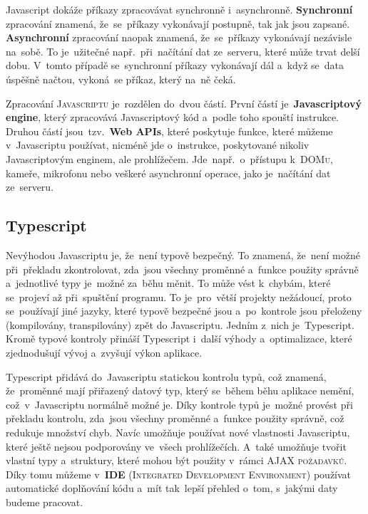 \documentclass[14pt,a4paper]{article}
\begin{document}
        Javascript dokáže příkazy zpracovávat synchronně i~asynchronně. \textbf{Synchronní} zpracování znamená, že~se~příkazy vykonávají postupně, tak jak
        jsou zapsané. \textbf{Asynchronní} zpracování naopak znamená, že~se~příkazy vykonávají nezávisle na~sobě. To je~užitečné např.~při~načítání dat ze~serveru,
        které může trvat delší dobu. V~tomto případě se~synchronní příkazy vykonávají dál a~když se~data úspěšně načtou, vykoná~se příkaz, který na~ně čeká. \parencite{kantor_javascript}

        Zpracování \textsc{Javascriptu} je~rozdělen do~dvou částí. První částí je~\textbf{Javascriptový engine}, který zpracovává Javascriptový kód a~podle toho spouští instrukce. Druhou částí jsou~tzv.~\textbf{Web APIs}, které poskytuje funkce, které můžeme v~Javascriptu používat, nicméně jde o~instrukce, poskytované nikoliv Javascriptovým enginem, ale prohlížečem. Jde~např.~o~přístupu k~\textsc{DOMu}, kameře, mikrofonu nebo veškeré asynchronní operace, jako je~načítání dat ze~serveru. \parencite{mdn:js}

        \subsection{Typescript}
        Nevýhodou Javascriptu je, že~není typově bezpečný. To znamená, že~není možné při~překladu zkontrolovat, zda~jsou všechny proměnné a~funkce použity správně a~jednotlivé typy je~možné za~běhu měnit. To může vést k~chybám, které se~projeví až při~spuštění programu. To je~pro~větší projekty nežádoucí, proto se~používají jiné jazyky, které typově bezpečné jsou a~po~kontrole jsou přeloženy (kompilovány, transpilovány) zpět do Javascriptu. Jedním z~nich je~Typescript. Kromě typové kontroly přináší Typescript i~další výhody a~optimalizace, které zjednodušují vývoj a~zvyšují výkon aplikace.

        Typescript přidává do~Javascriptu statickou kontrolu typů, což znamená, že~proměnné mají přiřazený datový typ, který se~během běhu aplikace nemění, což~v~Javascriptu normálně možné je. Díky kontrole typů je~možné provést při překladu kontrolu, zda~jsou všechny proměnné a~funkce použity správně, což redukuje množství chyb. Navíc umožňuje používat nové vlastnosti Javascriptu, které ještě nejsou podporovány ve~všech prohlížečích. A~také umožňuje tvořit vlastní typy a~struktury, které mohou být použity v~rámci \textsc{AJAX požadavků}. Díky tomu můžeme v~\textbf{IDE} (\textsc{Integrated Development Environment}) používat automatické doplňování kódu a~mít tak~lepší přehled o~tom, s~jakými daty budeme pracovat.
\end{document}
